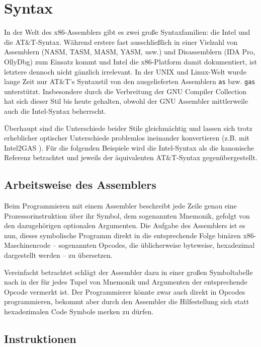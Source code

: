 \section{Syntax}

In der Welt des x86-Assemblers gibt es zwei große Syntaxfamilien: die Intel und
die AT\&T-Syntax. Während erstere fast ausschließlich in einer Vielzahl von Assemblern (NASM, TASM, MASM, YASM, usw.) und Disassemblern (IDA Pro, OllyDbg) zum Einsatz 
kommt
und Intel die x86-Platform damit dokumentiert, ist letztere dennoch nicht
gänzlich irrelevant. In der UNIX und Linux-Welt wurde lange Zeit nur AT\&T's
Syntaxstil von den ausgelieferten Assemblern \texttt{as} bzw. \texttt{gas}
unterstützt. Insbesondere durch die Verbreitung der GNU Compiler Collection
hat sich dieser Stil bis heute gehalten, obwohl der GNU Assembler mittlerweile
auch die Intel-Syntax beherrscht.

Überhaupt sind die Unterschiede beider Stile gleichmächtig und lassen sich
trotz erheblicher optischer Unterschiede problemlos ineinander konvertieren
(z.B. mit Intel2GAS \cite{i2g}). Für die folgenden Beispiele wird die
Intel-Syntax als die kanonische Referenz betrachtet und jeweils der
äquivalenten AT\&T-Syntax gegenübergestellt.

\subsection{Arbeitsweise des Assemblers}

Beim Programmieren mit einem Assembler beschreibt jede Zeile genau eine
Prozessorinstruktion über ihr Symbol, dem sogenannten Mnemonik, gefolgt von
den dazugehörigen optionalen Argumenten. Die Aufgabe des Assemblers ist es nun,
dieses symbolische Programm direkt in die entsprechende Folge binären
x86-Maschinencode – sogenannten Opcodes, die üblicherweise byteweise,
hexadezimal dargestellt werden – zu übersetzen.

Vereinfacht betrachtet schlägt der Assembler dazu in einer großen Symboltabelle nach in der für jedes Tupel von Mnemonik und Argumenten der entsprechende Opcode vermerkt
ist. Der Programmierer könnte zwar auch direkt in Opcodes programmieren, bekommt
aber durch den Assembler die Hilfestellung sich statt hexadezimalen Code
Symbole merken zu dürfen.

\subsection{Instruktionen}

